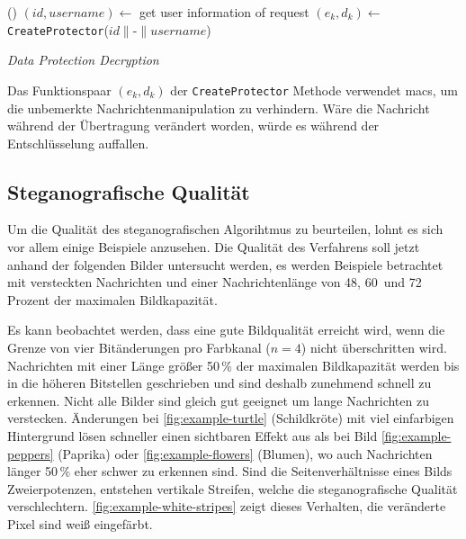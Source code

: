 \begin{algorithm}[h]
  \DontPrintSemicolon
  \Begin(){
    $(id, username) \leftarrow$ get user information of request\;
    $(e_k, d_k) \leftarrow$ \texttt{CreateProtector}($id \parallel \text{-} \parallel username$)\;
  }
  \caption{\textit{Data Protection Decryption}}
  \label{alg:data-unprotect}
\end{algorithm}

\noindent
Das Funktionspaar $(e_k, d_k)$ der \texttt{CreateProtector} Methode verwendet \acp{mac},
um die unbemerkte Nachrichtenmanipulation zu verhindern. Wäre die Nachricht während der Übertragung
verändert worden, würde es während der Entschlüsselung auffallen.

\subsection{Steganografische Qualität}
Um die Qualität des steganografischen Algorihtmus zu beurteilen,
lohnt es sich vor allem einige
Beispiele anzusehen. Die Qualität des Verfahrens soll jetzt
anhand der folgenden Bilder untersucht werden, es werden Beispiele
betrachtet mit versteckten Nachrichten und einer Nachrichtenlänge von
48, 60\ und 72 Prozent der maximalen Bildkapazität.

\newpage



\newpage



\newpage



\newpage

\noindent
Es kann beobachtet werden, dass
eine gute Bildqualität erreicht wird,
wenn die Grenze von vier Bitänderungen pro Farbkanal ($n = 4$) nicht überschritten wird.
Nachrichten mit einer Länge größer 50\,\% der maximalen Bildkapazität werden bis in die höheren
Bitstellen geschrieben und sind deshalb zunehmend schnell zu erkennen.
Nicht alle Bilder sind gleich gut geeignet um lange Nachrichten zu verstecken.
Änderungen bei \ref{fig:example-turtle} (Schildkröte) mit viel einfarbigen Hintergrund
lösen schneller einen sichtbaren Effekt aus als bei Bild \ref{fig:example-peppers}
(Paprika) oder \ref{fig:example-flowers} (Blumen), wo auch Nachrichten länger
50\,\% eher schwer zu erkennen sind. Sind die Seitenverhältnisse
eines Bilds Zweierpotenzen, entstehen vertikale Streifen,
welche die steganografische Qualität verschlechtern.
\autoref{fig:example-white-stripes} zeigt dieses
Verhalten, die veränderte Pixel sind weiß eingefärbt.

